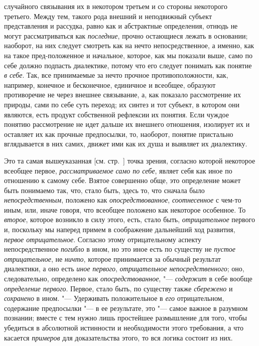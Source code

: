 случайного связывания их в некотором третьем и со стороны некоторого
третьего. Между тем, такого рода внешний и неподвижный субъект
представления и рассудка, равно как и абстрактные определения, отнюдь не
могут рассматриваться как {\em последние}, прочно
остающиеся лежать в основании; наоборот, на них следует
смотреть как на нечто непосредственное, а именно, как на такое
пред-положенное и начальное, которое, как мы показали выше, само по себе
должно подпасть диалектике, потому что его следует понимать как понятие
{\em в себе}. Так, все
принимаемые за нечто прочное противоположности, как, например, конечное и
бесконечное, единичное и всеобщее, образуют противоречие не через внешнее
связывание, а, как показало рассмотрение их природы, сами по себе суть
переход; их синтез и тот субъект, в котором они являются, есть продукт
собственной рефлексии их понятия. Если чуждое понятию рассмотрение не идет
дальше их внешнего отношения, изолирует их и оставляет их как прочные
предпосылки, то, наоборот, понятие пристально вглядывается в них самих,
движет ими как их душа и выявляет их диалектику.

Это та самая вышеуказанная [см. стр.~\pageref{bkm:bmpg224a}]
точка зрения, согласно которой некоторое всеобщее первое,
{\em рассматриваемое} {\em само по себе}, являет
себя как иное по отношению к самому себе. Взятое совершенно обще, это
определение может быть понимаемо так, что, стало быть, здесь то, что
сначала было {\em непосредственным},
положено как {\em опосредствованное}, {\em соотнесенное} с
чем-то иным, или, иначе говоря, что всеобщее положено как некоторое
особенное. То {\em второе},
которое возникло в силу этого, есть, стало быть, {\em отрицательное}
первого и, поскольку мы наперед примем в соображение
дальнейший ход развития, {\em первое
отрицательное}. Согласно этому отрицательному аспекту
непосредственное {\em погибло}
в ином, но это иное есть по существу не
{\em пустое отрицательное}, не {\em ничто},
которое принимается за обычный результат диалектики, а оно
есть {\em иное первого},
{\em отрицательное непосредственного}; оно, следовательно, определено как
{\em опосредствованное}, "--- {\em содержит} в себе
вообще {\em определение первого}. Первое, стало быть, по существу также
{\em сбережено} и {\em сохранено} в ином. "--- Удерживать положительное в
{\em его} отрицательном, содержание предпосылки "--- в ее
результате,
это "--- самое важное в разумном познании; вместе
с тем нужно лишь простейшее размышление для того, чтобы убедиться в
абсолютной истинности и необходимости этого требования, а что касается
{\em примеров} для доказательства этого, то вся логика состоит из них.

